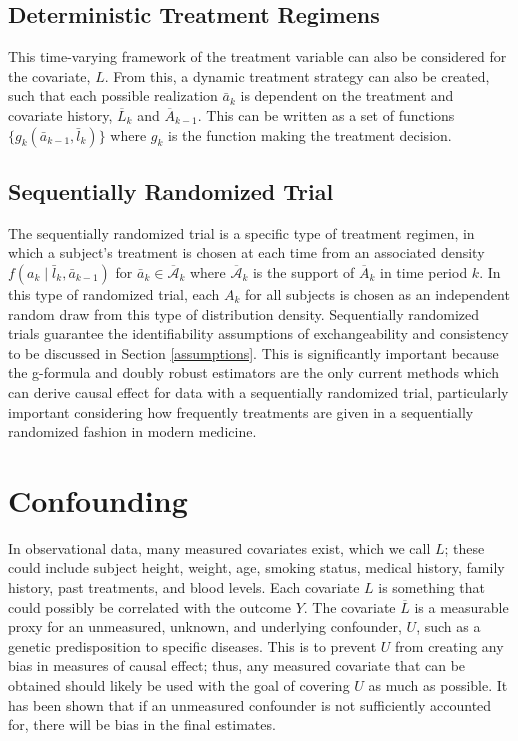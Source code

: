 \subsection{Deterministic Treatment Regimens} 
This time-varying framework of the treatment variable can also be considered for the covariate, $L$.  From this, a dynamic treatment strategy can also be created, such that each possible realization $\bar{a}_{k}$ is dependent on the treatment and covariate history, $\overline{L}_k$ and $\overline{A}_{k-1}$.  This can be written as a set of functions $\{g_k (\bar{a}_{k-1}, \bar{l}_k )\}$ where $g_k$ is the function making the treatment decision.  

\subsection{Sequentially Randomized Trial} 
The sequentially randomized trial is a specific type of treatment regimen, in which a subject's treatment is chosen at each time from an associated density $f (a_k \mid \bar{l}_k, \bar{a}_{k-1})$ for $\bar{a}_k \in \overline{\mathcal{A}}_k$ where $\overline{\mathcal{A}}_k$ is the support of $\overline{A}_k$ in time period $k$.\cite{young2011comparative}  In this type of randomized trial, each $A_k$ for all subjects is chosen as an independent random draw from this type of distribution density.  Sequentially randomized trials guarantee the identifiability assumptions of exchangeability and consistency to be discussed in Section \ref{assumptions}.  This is significantly important because the g-formula and doubly robust estimators are the only current methods which can derive causal effect for data with a sequentially randomized trial, particularly important considering how frequently treatments are given in a sequentially randomized fashion in modern medicine.

\section{Confounding} 
In observational data, many measured covariates exist, which we call $L$; these could include subject height, weight, age, smoking status, medical history, family history, past treatments, and blood levels.  Each covariate $L$ is something that could possibly be correlated with the outcome $Y$. The covariate $\overline{L}$ is a measurable proxy for an unmeasured, unknown, and underlying confounder, $U$, such as a genetic predisposition to specific diseases.  This is to prevent $U$ from creating any bias in measures of causal effect; thus, any measured covariate that can be obtained should likely be used with the goal of covering $U$ as much as possible. It has been shown that if an unmeasured confounder is not sufficiently accounted for, there will be bias in the final estimates.\cite{vanderweele2011unmeasured}

